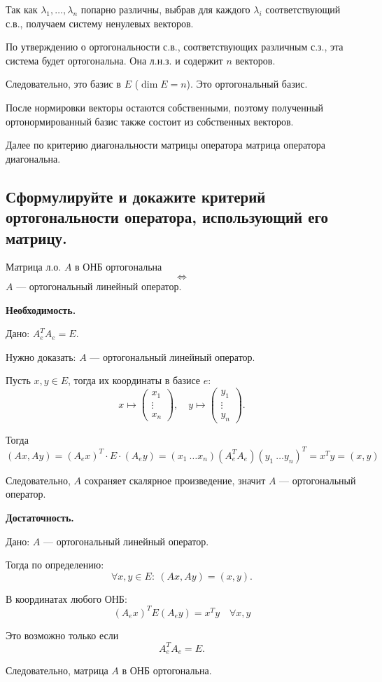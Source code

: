 \begin{Proof}
    Так как $\lambda_1,\ldots,\lambda_n$ попарно различны, выбрав для каждого $\lambda_i$ соответствующий с.в., получаем систему ненулевых векторов.
    
    По утверждению о ортогональности с.в., соответствующих различным с.з., эта система будет ортогональна. Она л.н.з. и содержит $n$ векторов.
    
    Следовательно, это базис в $E$ ($\dim E=n$). Это ортогональный базис.
    
    \bigskip
    
    После нормировки векторы остаются собственными, поэтому полученный ортонормированный базис также состоит из собственных векторов.
    
    Далее по критерию диагональности матрицы оператора матрица оператора диагональна.
\end{Proof}
\subsection{Сформулируйте и докажите критерий ортогональности оператора, использующий его матрицу.}

\begin{theorem}
    Матрица л.о. $A$ в ОНБ ортогональна
    \[
        \Longleftrightarrow
    \]
    $A$ --- ортогональный линейный оператор.
\end{theorem}

\begin{Proof}
    {\bf Необходимость.}

    Дано: $A_e^T A_e = E$.

    Нужно доказать: $A$ --- ортогональный линейный оператор.

    Пусть $x, y \in E$, тогда их координаты в базисе $e$:
    \[
        x \mapsto
        \begin{pmatrix}x_1\\ \vdots\\ x_n\end{pmatrix},\quad
        y \mapsto
        \begin{pmatrix}y_1\\ \vdots\\ y_n\end{pmatrix}.
    \]

    Тогда
    \[
        (Ax, Ay) = (A_e x)^T \cdot E \cdot (A_e y) = (x_1\ \ldots x_n)(A_e^T A_e)(y_1\ \ldots y_n)^T = x^T y = (x,y)
    \]

    Следовательно, $A$ сохраняет скалярное произведение, значит $A$ --- ортогональный оператор.

    \bigskip

    {\bf Достаточность.}

    Дано: $A$ --- ортогональный линейный оператор.

    Тогда по определению:
    \[
        \forall x, y \in E:\ (Ax, Ay) = (x,y).
    \]

    В координатах любого ОНБ:
    \[
        (A_e x)^T E (A_e y) = x^T y \quad \forall x, y
    \]

    Это возможно только если
    \[
        A_e^T A_e = E.
    \]

    Следовательно, матрица $A$ в ОНБ ортогональна.
\end{Proof}
